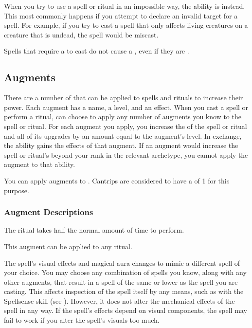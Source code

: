          When you try to use a spell or ritual in an impossible way, the ability is  instead.
        This most commonly happens if you attempt to declare an invalid target for a spell.
        For example, if you try to cast a spell that only affects living creatures on a creature that is undead, the spell would be miscast.

         Spells that require a  to cast do not cause a , even if they are .

    \subsection{Augments}\label{Augments}
        There are a number of  that can be applied to spells and rituals to increase their power.
        Each augment has a name, a level, and an effect.
        When you cast a spell or perform a ritual, can choose to apply any number of augments you know to the spell or ritual.
        For each augment you apply, you increase the  of the spell or ritual and all of its upgrades by an amount equal to the augment's level.
        In exchange, the ability gains the effects of that augment.
        If an augment would increase the spell or ritual's  beyond your rank in the relevant archetype, you cannot apply the augment to that ability.

        You can apply augments to .
        Cantrips are considered to have a  of 1 for this purpose.

        \subsubsection{Augment Descriptions}\label{Augment Descriptions}

             The ritual takes half the normal amount of time to perform.
            \par This augment can be applied to any ritual.

             The spell's visual effects and magical aura changes to mimic a different spell of your choice.
            You may choose any combination of spells you know, along with any other augments, that result in a spell of the same  or lower as the spell you are casting.
            This affects inspection of the spell itself by any means, such as with the Spellsense skill (see ).
            However, it does not alter the mechanical effects of the spell in any way.
            If the spell's effects depend on visual components, the spell may fail to work if you alter the spell's visuals too much. 

